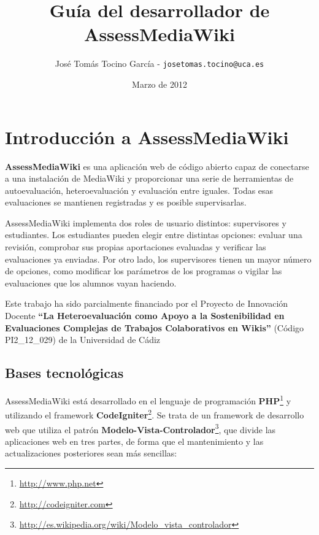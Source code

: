 \documentclass[11pt]{article}
\title{Guía del desarrollador de AssessMediaWiki}
\author{José Tomás Tocino García - \texttt{josetomas.tocino@uca.es}}
\date{Marzo de 2012}
\begin{document}
\begin{titlepage}
\maketitle  
\end{titlepage}

\section{Introducción a AssessMediaWiki}

\textbf{AssessMediaWiki} es una aplicación web de código abierto capaz de
conectarse a una instalación de MediaWiki y proporcionar una serie de
herramientas de autoevaluación, heteroevaluación y evaluación entre
iguales. Todas esas evaluaciones se mantienen registradas y es posible
supervisarlas. 

AssessMediaWiki implementa dos roles de usuario distintos: supervisores y
estudiantes. Los estudiantes pueden elegir entre distintas opciones: evaluar una
revisión, comprobar sus propias aportaciones evaluadas y verificar las
evaluaciones ya enviadas. Por otro lado, los supervisores tienen un mayor número
de opciones, como modificar los parámetros de los programas o vigilar las
evaluaciones que los alumnos vayan haciendo.

Este trabajo ha sido parcialmente financiado por el Proyecto de Innovación
Docente \textbf{``La Heteroevaluación como Apoyo a la Sostenibilidad en Evaluaciones
Complejas de Trabajos Colaborativos en Wikis''} (Código PI2\_12\_029) de la
Universidad de Cádiz

\subsection{Bases tecnológicas}

AssessMediaWiki está desarrollado en el lenguaje de programación
\textbf{PHP}\footnote{\url{http://www.php.net}} y utilizando el framework
\textbf{CodeIgniter}\footnote{\url{http://codeigniter.com}}. Se trata de un
framework de desarrollo web que utiliza el patrón
\textbf{Modelo-Vista-Controlador}\footnote{\url{http://es.wikipedia.org/wiki/Modelo_vista_controlador}},
que divide las aplicaciones web en tres partes, de forma que el mantenimiento y
las actualizaciones posteriores sean más sencillas:
\end{document}

